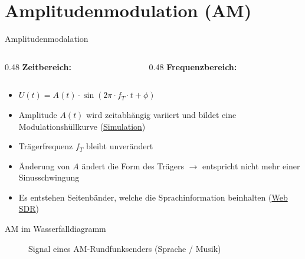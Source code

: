 \section{Amplitudenmodulation (AM)}
\label{section:am}

\begin{frame}{Amplitudenmodalation}
    \begin{columns}[T]
        \begin{column}{0.48\linewidth}
            \textbf{Zeitbereich:}\\

            \vspace{0.5cm}
        \end{column}
        \begin{column}{0.48\linewidth}
            \textbf{Frequenzbereich:}\\

        \end{column}
    \end{columns}
    \begin{itemize}
        \item $U(t) = A(t) \cdot \sin(2\pi \cdot f_T\cdot t + \phi)$
        \item Amplitude $A(t)$ wird zeitabhängig variiert und bildet eine Modulationshüllkurve (\href{https://tinyurl.com/27um62re}{Simulation})
        \item Trägerfrequenz $f_T$ bleibt unverändert
        \item Änderung von $A$ ändert die Form des Trägers $\rightarrow$ entspricht nicht mehr einer Sinusschwingung
        \item Es entstehen Seitenbänder, welche die Sprachinformation beinhalten (\href{http://websdr.ewi.utwente.nl:8901}{Web SDR})
    \end{itemize}
\end{frame}

\begin{frame}{AM im Wasserfalldiagramm}
    \begin{figure}
        \centering
        \caption{\scriptsize Signal eines AM-Rundfunksenders (Sprache / Musik)}
        \label{n_Wasserfall_AM}
    \end{figure}
\end{frame}

